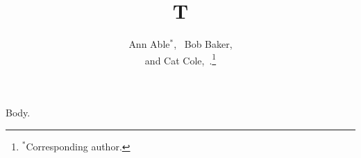 \documentclass[journal]{IEEEtran}
\begin{document}
\title{T}
\author{Ann Able$^{*}$,~ Bob Baker,\\ and Cat Cole,~.\thanks{$^{*}$Corresponding author.}}
\maketitle
Body.
\end{document}
